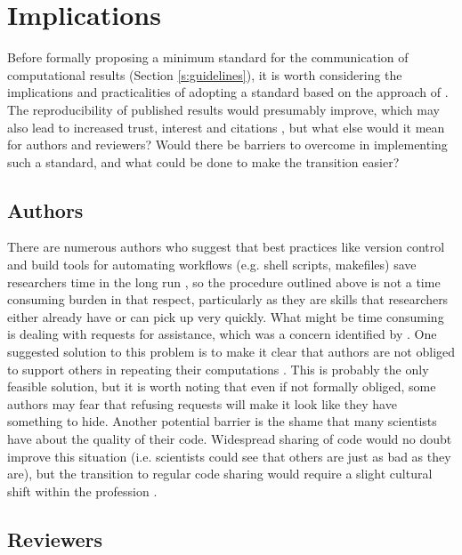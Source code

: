 \section{Implications}

Before formally proposing a minimum standard for the communication of computational results (Section \ref{s:guidelines}), it is worth considering the implications and practicalities of adopting a standard based on the approach of \citet{Irving2015}. The reproducibility of published results would presumably improve, which may also lead to increased trust, interest and citations \citep{Piwowar2007}, but what else would it mean for authors and reviewers? Would there be barriers to overcome in implementing such a standard, and what could be done to make the transition easier?

\subsection{Authors}

There are numerous authors who suggest that best practices like version control and build tools for automating workflows (e.g. shell scripts, makefiles) save researchers time in the long run \citep[e.g.][]{Sandve2013,Wilson2014a}, so the procedure outlined above is not a time consuming burden in that respect, particularly as they are skills that researchers either already have or can pick up very quickly. What might be time consuming is dealing with requests for assistance, which was a concern identified by \citet{Stodden2010}. One suggested solution to this problem is to make it clear that authors are not obliged to support others in repeating their computations \citep{Easterbrook2014}. This is probably the only feasible solution, but it is worth noting that even if not formally obliged, some authors may fear that refusing requests will make it look like they have something to hide. Another potential barrier is the shame that many scientists have about the quality of their code. Widespread sharing of code would no doubt improve this situation (i.e. scientists could see that others are just as bad as they are), but the transition to regular code sharing would require a slight cultural shift within the profession \citep{Barnes2010}.

\subsection{Reviewers}

